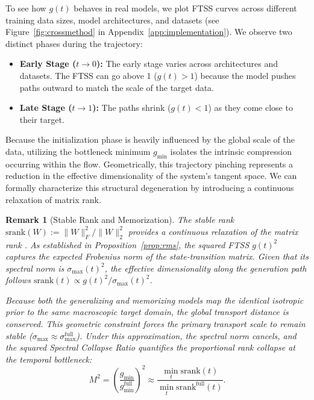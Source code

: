 \documentclass[11pt]{article}
\newtheorem{remark}[theorem]{Remark}
\begin{document}
To see how $g(t)$ behaves in real models, we plot FTSS curves across different training data sizes, model architectures, and datasets (see Figure~\ref{fig:crossmethod} in Appendix~\ref{app:implementation}). We observe two distinct phases during the trajectory:
\begin{itemize}
    \item \textbf{Early Stage ($t \to 0$):} The early stage varies across architectures and datasets. The FTSS can go above 1 ($g(t) > 1$) because the model pushes paths outward to match the scale of the target data.
    \item \textbf{Late Stage ($t \to 1$):} The paths shrink ($g(t) < 1$) as they come close to their target.
\end{itemize}

Because the initialization phase is heavily influenced by the global scale of the data, utilizing the bottleneck minimum $g_{\min}$ isolates the intrinsic compression occurring within the flow. Geometrically, this trajectory pinching represents a reduction in the effective dimensionality of the system's tangent space. We can formally characterize this structural degeneration by introducing a continuous relaxation of matrix rank.

\begin{remark}[Stable Rank and Memorization]\label{rm:srank}
The stable rank $\mathrm{srank}(W) := \|W\|_F^2 / \|W\|_2^2$ provides a continuous relaxation of the matrix rank \cite{vershynin2012introduction, bartlett2017spectrally}. As established in Proposition~\ref{prop:rms}, the squared FTSS $g(t)^2$ captures the expected Frobenius norm of the state-transition matrix. Given that its spectral norm is $\sigma_{\max}(t)^2$, the effective dimensionality along the generation path follows $\mathrm{srank}(t) \propto g(t)^2 / \sigma_{\max}(t)^2$.

Because both the generalizing and memorizing models map the identical isotropic prior to the same macroscopic target domain, the global transport distance is conserved. This geometric constraint forces the primary transport scale to remain stable ($\sigma_{\max} \approx \sigma_{\max}^{\text{full}}$). Under this approximation, the spectral norm cancels, and the squared Spectral Collapse Ratio quantifies the proportional rank collapse at the temporal bottleneck:
\begin{equation}
M^2 = \left( \frac{g_{\min}}{g_{\min}^{\text{full}}} \right)^2 \approx \frac{\min_t \mathrm{srank}(t)}{\min_t \mathrm{srank}^{\text{full}}(t)}.
\end{equation}
\end{remark}
\end{document}
